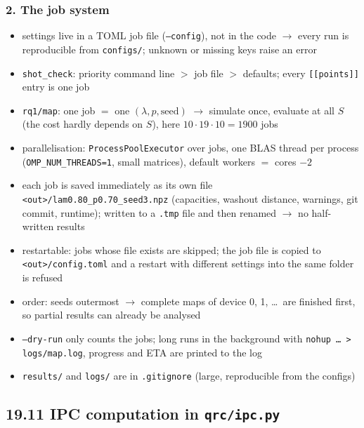 \subsubsection*{2. The job system}
\begin{itemize}
    \item settings live in a TOML job file (\texttt{--config}), not in the code $\to$ every run is
    reproducible from \texttt{configs/}; unknown or missing keys raise an error
    \item \texttt{shot\_check}: priority command line $>$ job file $>$ defaults; every \texttt{[[points]]}
    entry is one job
    \item \texttt{rq1/map}: one job $=$ one $(\lambda, p, \text{seed})$ $\to$ simulate once, evaluate at all $S$
    (the cost hardly depends on $S$), here $10 \cdot 19 \cdot 10 = 1900$ jobs
    \item parallelisation: \texttt{ProcessPoolExecutor} over jobs, one BLAS thread per process
    (\texttt{OMP\_NUM\_THREADS=1}, small matrices), default workers $=$ cores $- 2$
    \item each job is saved immediately as its own file \texttt{<out>/lam0.80\_p0.70\_seed3.npz}
    (capacities, washout distance, warnings, git commit, runtime); written to a \texttt{.tmp} file and then
    renamed $\to$ no half-written results
    \item restartable: jobs whose file exists are skipped; the job file is copied to
    \texttt{<out>/config.toml} and a restart with different settings into the same folder is refused
    \item order: seeds outermost $\to$ complete maps of device 0, 1, \ldots\ are finished first, so partial
    results can already be analysed
    \item \texttt{--dry-run} only counts the jobs; long runs in the background with
    \texttt{nohup \ldots\ > logs/map.log}, progress and ETA are printed to the log
    \item \texttt{results/} and \texttt{logs/} are in \texttt{.gitignore} (large, reproducible from the configs)
\end{itemize}

\subsection*{19.11 \quad IPC computation in \texttt{qrc/ipc.py}}
\label{sec:ipc-implementation}

